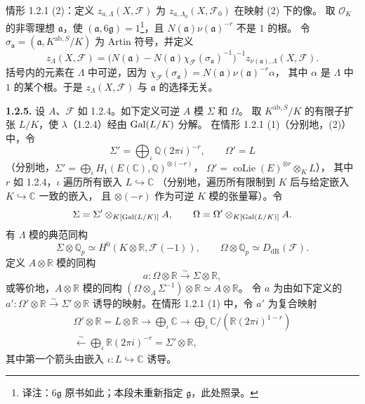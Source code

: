 情形 1.2.1 (2)：定义 $z_{a,\Lambda}(X,\mathscr F)$ 为
$z_{a,\Lambda_0}(X,\mathscr F_0)$ 在映射 (2) 下的像。
取 $\mathcal O_K$ 的非零理想 $\mathfrak a$，使 $(\mathfrak a,6\mathfrak g)=1$\footnote{译注：$6\mathfrak g$ 原书如此；本段未重新指定 $\mathfrak g$，此处照录。}，且
$N(\mathfrak a)\nu(\mathfrak a)^{-r}$ 不是 $1$ 的根。
令 $\sigma_{\mathfrak a}=(\mathfrak a,K^{\mathrm{ab},S}/K)$ 为 Artin 符号，并定义
\[
z_\Lambda(X,\mathscr F)=
\bigl(N(\mathfrak a)-N(\mathfrak a)\chi_{\mathscr F}(\sigma_{\mathfrak a})^{-1}\bigr)^{-1}
z_{\nu(\mathfrak a),\Lambda}(X,\mathscr F).
\]
括号内的元素在 $\Lambda$ 中可逆，因为
$\chi_{\mathscr F}(\sigma_{\mathfrak a})=N(\mathfrak a)\nu(\mathfrak a)^{-r}\alpha$，
其中 $\alpha$ 是 $\Lambda$ 中 $1$ 的某个根。于是 $z_\Lambda(X,\mathscr F)$ 与
$\mathfrak a$ 的选择无关。

\noindent\textbf{1.2.5.} 设 $A$、$\mathscr F$ 如 1.2.4。如下定义可逆 $A$ 模 $\Sigma$ 和 $\Omega$。
取 $K^{\mathrm{ab},S}/K$ 的有限子扩张 $L/K$，使 $\lambda$（1.2.4）经由 $\operatorname{Gal}(L/K)$ 分解。
在情形 1.2.1 (1)（分别地，(2)）中，令
\[
\Sigma'=\bigoplus_\iota\mathbb Q(2\pi i)^{-r},\qquad\Omega'=L
\]
（分别地，$\Sigma'=\bigoplus_\iota H_1(E(\mathbb C),\mathbb Q)^{\otimes(-r)}$，
$\Omega'=\operatorname{coLie}(E)^{\otimes r}\otimes_KL$），
其中 $r$ 如 1.2.4，$\iota$ 遍历所有嵌入 $L\hookrightarrow\mathbb C$
（分别地，遍历所有限制到 $K$ 后与给定嵌入 $K\hookrightarrow\mathbb C$ 一致的嵌入，
且 $\otimes(-r)$ 作为可逆 $K$ 模的张量幂）。令
\[
\Sigma=\Sigma'\otimes_{K[\operatorname{Gal}(L/K)]}A,\qquad
\Omega=\Omega'\otimes_{K[\operatorname{Gal}(L/K)]}A.
\]
有 $\Lambda$ 模的典范同构
\[
\Sigma\otimes\mathbb Q_p\simeq H^0(K\otimes\mathbb R,\mathscr F(-1)),
\qquad\Omega\otimes\mathbb Q_p\simeq D_{\mathrm{dR}}(\mathscr F).
\]
定义 $A\otimes\mathbb R$ 模的同构
\[
a:\Omega\otimes\mathbb R\xrightarrow{\sim}\Sigma\otimes\mathbb R,
\]
或等价地，$A\otimes\mathbb R$ 模的同构
$(\Omega\otimes_A\Sigma^{-1})\otimes\mathbb R\simeq A\otimes\mathbb R$。
令 $a$ 为由如下定义的 $a':\Omega'\otimes\mathbb R\xrightarrow{\sim}\Sigma'\otimes\mathbb R$
诱导的映射。在情形 1.2.1 (1) 中，令 $a'$ 为复合映射
\[
\begin{gathered}
\Omega'\otimes\mathbb R=L\otimes\mathbb R\longrightarrow\bigoplus_\iota\mathbb C
\longrightarrow\bigoplus_\iota\mathbb C/(\mathbb R(2\pi i)^{1-r})\\
\xleftarrow{\sim}\bigoplus_\iota\mathbb R(2\pi i)^{-r}=\Sigma'\otimes\mathbb R,
\end{gathered}
\]
其中第一个箭头由嵌入 $\iota:L\hookrightarrow\mathbb C$ 诱导。
